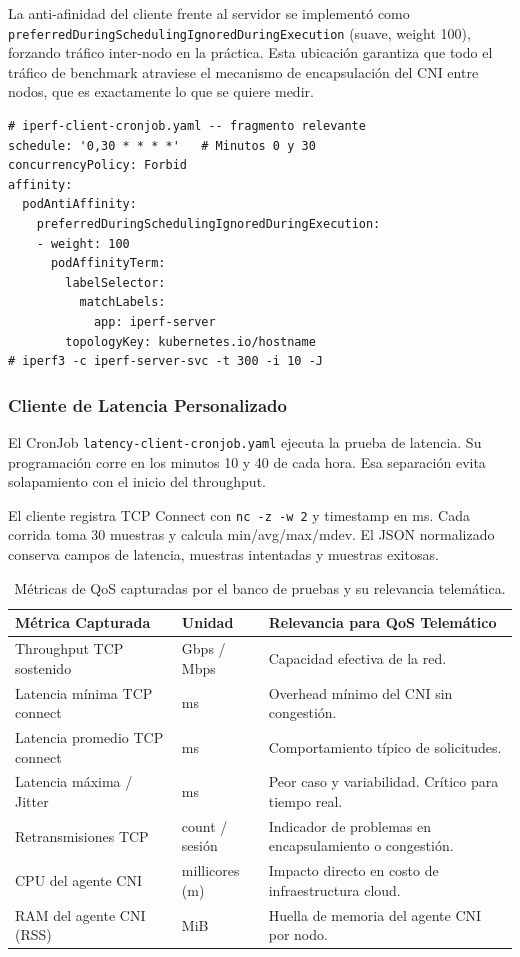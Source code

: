 La anti-afinidad del cliente frente al servidor se implementó como \texttt{preferredDuringSchedulingIgnoredDuringExecution} (suave, weight 100), forzando tráfico inter-nodo en la práctica. Esta ubicación garantiza que todo el tráfico de benchmark atraviese el mecanismo de encapsulación del CNI entre nodos, que es exactamente lo que se quiere medir.

\begin{lstlisting}
# iperf-client-cronjob.yaml -- fragmento relevante
schedule: '0,30 * * * *'   # Minutos 0 y 30
concurrencyPolicy: Forbid
affinity:
  podAntiAffinity:
    preferredDuringSchedulingIgnoredDuringExecution:
    - weight: 100
      podAffinityTerm:
        labelSelector:
          matchLabels:
            app: iperf-server
        topologyKey: kubernetes.io/hostname
# iperf3 -c iperf-server-svc -t 300 -i 10 -J
\end{lstlisting}

\subsubsection{Cliente de Latencia Personalizado}

El CronJob \texttt{latency-client-cronjob.yaml} ejecuta la prueba de latencia. Su programación corre en los minutos 10 y 40 de cada hora. Esa separación evita solapamiento con el inicio del throughput.

El cliente registra TCP Connect con \texttt{nc -z -w 2} y timestamp en ms. Cada corrida toma 30 muestras y calcula min/avg/max/mdev. El JSON normalizado conserva campos de latencia, muestras intentadas y muestras exitosas.

\begin{table}[htbp]
\centering
\scriptsize
\renewcommand{\arraystretch}{1.25}
\setlength{\tabcolsep}{4pt}
\caption{Métricas de QoS capturadas por el banco de pruebas y su relevancia telemática.}
\label{tab:metricas-qos-implementacion}
\begin{tabularx}{\textwidth}{|p{4cm}|p{2.4cm}|Y|}
\hline
\textbf{Métrica Capturada} & \textbf{Unidad} & \textbf{Relevancia para QoS Telemático} \\
\hline
Throughput TCP sostenido & Gbps / Mbps & Capacidad efectiva de la red. \\
\hline
Latencia mínima TCP connect & ms & Overhead mínimo del CNI sin congestión. \\
\hline
Latencia promedio TCP connect & ms & Comportamiento típico de solicitudes. \\
\hline
Latencia máxima / Jitter & ms & Peor caso y variabilidad. Crítico para tiempo real. \\
\hline
Retransmisiones TCP & count / sesión & Indicador de problemas en encapsulamiento o congestión. \\
\hline
CPU del agente CNI & millicores (m) & Impacto directo en costo de infraestructura cloud. \\
\hline
RAM del agente CNI (RSS) & MiB & Huella de memoria del agente CNI por nodo. \\
\hline
\end{tabularx}
\end{table}

